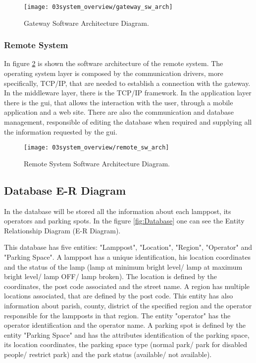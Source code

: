 \begin{figure}[H]
	\centering
	\texttt{[image: 03system\_overview/gateway\_sw\_arch]}
	\caption{Gateway Software Architecture Diagram.}
	\label{fig:gateway_sw_arch}
\end{figure}

\subsubsection{Remote System}
In figure \ref{fig:remote_sw_arch} is shown the software architecture of the remote system. The operating system layer is composed by the communication drivers, more specifically, TCP/IP, that are needed to establish a connection with the gateway. In the middleware layer, there is the TCP/IP framework.
In the application layer there is the \ac{gui}, that allows the interaction with the user, through a mobile application and a web site. There are also the communication and database management, responsible of editing the database when required and supplying all the information requested by the \ac{gui}.

\begin{figure}[H]
	\centering
	\texttt{[image: 03system\_overview/remote\_sw\_arch]}
	\caption{Remote System Software Architecture Diagram.}
	\label{fig:remote_sw_arch}
\end{figure}

\clearpage
\subsection{Database E-R Diagram}
In the database will be stored all the information about each lamppost, its operators and parking spots. In the figure \ref{fig:Database} one can see the Entity Relationship Diagram (E-R Diagram).


This database has five entities: "Lamppost", "Location", "Region", "Operator" and "Parking Space". A lamppost has a unique identification, his location coordinates and the status of the lamp (lamp at minimum bright level/ lamp at maximum bright level/ lamp OFF/ lamp broken). The location is defined by the coordinates, the post code associated and the street name. A region has multiple locations associated, that are defined by the post code. This entity has also information about parish, county, district of the specified region and the operator responsible for the lampposts in that region. The entity "operator" has the operator identification and the operator name. A parking spot is defined by the entity "Parking Space" and has the attributes identification of the parking space, its location coordinates, the parking space type (normal park/ park for disabled people/ restrict park) and the park status (available/ not available).

